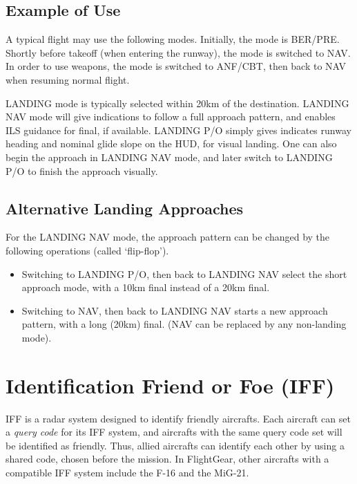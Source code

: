\documentclass[a4paper]{report}
\begin{document}
{\subsection{Example of Use}
A typical flight may use the following modes.
Initially, the mode is BER/PRE.
Shortly before takeoff (when entering the runway), the mode is switched to NAV.
In order to use weapons, the mode is switched to ANF/CBT,
then back to NAV when resuming normal flight.

LANDING mode is typically selected within 20km of the destination.
LANDING NAV mode will give indications to follow a full approach pattern,
and enables ILS guidance for final, if available.
LANDING P/O simply gives indicates runway heading and nominal glide slope on the HUD, for visual landing.
One can also begin the approach in LANDING NAV mode,
and later switch to LANDING P/O to finish the approach visually.

\subsection{Alternative Landing Approaches}
For the LANDING NAV mode, the approach pattern can be changed
by the following operations (called `flip-flop').
\begin{itemize}
  \item Switching to LANDING P/O, then back to LANDING NAV select the short approach mode,
    with a 10km final instead of a 20km final.
  \item Switching to NAV, then back to LANDING NAV
    starts a new approach pattern, with a long (20km) final.
    (NAV can be replaced by any non-landing mode).
\end{itemize}
}

\section{Identification Friend or Foe (IFF)}
\label{sec:iff}
IFF is a radar system designed to identify friendly aircrafts\footnotemark{}.
Each aircraft can set a \emph{query code} for its IFF system,
and aircrafts with the same query code set will be identified as friendly.
Thus, allied aircrafts can identify each other by using a shared code, chosen before the mission.
In FlightGear, other aircrafts with a compatible IFF system include the F-16 and the MiG-21.
\end{document}

